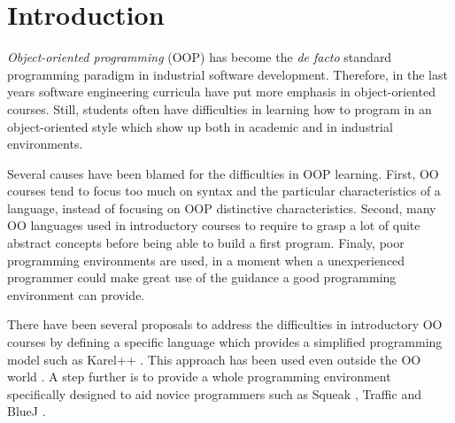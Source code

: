 \section{Introduction}
\label{sec:intro}


\emph{Object-oriented programming} (OOP) has become the \textit{de facto} standard programming paradigm in industrial software development.
Therefore, in the last years software engineering curricula have put more emphasis in object-oriented courses.
Still, students often have difficulties in learning how to program in an object-oriented style which show up both in academic and in industrial environments.

Several causes have been blamed for the difficulties in OOP learning.
First, OO courses tend to focus too much on syntax and the particular characteristics of a language, instead of focusing on OOP distinctive characteristics.
Second, many OO languages used in introductory courses to require to grasp a lot of quite abstract concepts before being able to build a first program.
Finaly, poor programming environments are used, in a moment when a unexperienced programmer could make great use of the guidance a good programming environment can provide.

\medskip 


There have been several proposals to address the difficulties in introductory OO courses 
by defining a specific language which provides a simplified programming model such as Karel++ \cite{bergin_karel++:_1996} .
This approach has been used even outside the OO world \cite{feurzeig_programming-languages_1970, pattis_karel_1981, lopez_nombre_2012}.
A step further is to provide a whole programming environment specifically designed to aid novice programmers 
such as Squeak \cite{ingalls_back_1997}, Traffic \cite{broy_outside-method_2003} and BlueJ \cite{bennedsen_bluej_2010}. 

